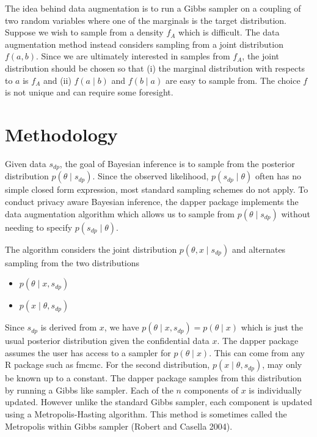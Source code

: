 The idea behind data augmentation is to run a Gibbs sampler on a coupling of two random variables where one
of the marginals is the target distribution. Suppose we wish to sample from a density \(f_{A}\) which is difficult.
The data augmentation method instead considers sampling from a joint distribution \(f(a,b)\). Since
we are ultimately interested in samples from \(f_A\), the joint
distribution should be chosen so that (i) the marginal distribution
with respects to \(a\) is \(f_{A}\) and (ii) \(f(a \mid b)\) and \(f(b \mid a)\)
are easy to sample from. The choice \(f\) is not unique and can require
some foresight.

\hypertarget{methodology}{%
\section{Methodology}\label{methodology}}

Given data \(s_{dp}\), the goal of Bayesian inference is to sample from the
posterior distribution \(p(\theta \mid s_{dp})\). Since the observed likelihood,
\(p(s_{dp} \mid \theta)\) often has no simple closed form expression, most standard
sampling schemes do not apply. To conduct privacy aware Bayesian inference, the dapper package implements
the data augmentation algorithm which allows us to sample from \(p(\theta \mid s_{dp})\)
without needing to specify \(p(s_{dp} \mid \theta)\).

The algorithm considers the joint distribution \(p(\theta, x \mid s_{dp})\) and
alternates sampling from the two distributions

\begin{itemize}
\tightlist
\item
  \(p(\theta \mid x, s_{dp})\)
\item
  \(p(x \mid \theta, s_{dp})\)
\end{itemize}

Since \(s_{dp}\) is derived from \(x\), we have \(p(\theta \mid x, s_{dp}) = p(\theta \mid x)\) which
is just the usual posterior distribution given the confidential data \(x\). The dapper
package assumes the user has access to a sampler for \(p(\theta \mid x)\). This can
come from any R package such as fmcmc. For the second distribution, \(p(x \mid \theta, s_{dp})\), may
only be known up to a constant. The dapper package samples from this distribution by
running a Gibbs like sampler. Each of the \(n\) components of \(x\) is individually
updated. However unlike the standard Gibbs sampler, each component is updated
using a Metropolis-Hasting algorithm. This method is sometimes called the Metropolis within Gibbs sampler (Robert and Casella 2004).

